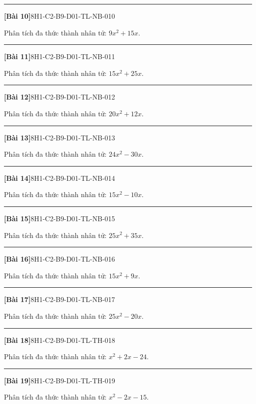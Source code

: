 \documentclass[12pt,a4paper]{article}
\newif\ifloigiai
\newenvironment{cauhoi}[2]{%
  \par\medskip\noindent\rule{\textwidth}{0.4pt}\par\nopagebreak
  \noindent\textbf{[#1]}\hfill{\scriptsize\ttfamily #2}\par\nopagebreak\smallskip}{\par}
\newcommand{\loigiai}[1]{\ifloigiai\par\smallskip\noindent\textit{Lời giải.} #1\par\fi}
\begin{document}
\begin{cauhoi}{Bài 10}{8H1-C2-B9-D01-TL-NB-010}
Phân tích đa thức thành nhân tử: $9x^{2} + 15x$.
\loigiai{Nhân tử chung của các hạng tử là $3x$. Vậy $9x^{2} + 15x=3x(3x + 5)$.}
\end{cauhoi}
\begin{cauhoi}{Bài 11}{8H1-C2-B9-D01-TL-NB-011}
Phân tích đa thức thành nhân tử: $15x^{2} + 25x$.
\loigiai{Nhân tử chung của các hạng tử là $5x$. Vậy $15x^{2} + 25x=5x(3x + 5)$.}
\end{cauhoi}
\begin{cauhoi}{Bài 12}{8H1-C2-B9-D01-TL-NB-012}
Phân tích đa thức thành nhân tử: $20x^{2} + 12x$.
\loigiai{Nhân tử chung của các hạng tử là $4x$. Vậy $20x^{2} + 12x=4x(5x + 3)$.}
\end{cauhoi}
\begin{cauhoi}{Bài 13}{8H1-C2-B9-D01-TL-NB-013}
Phân tích đa thức thành nhân tử: $24x^{2} - 30x$.
\loigiai{Nhân tử chung của các hạng tử là $6x$. Vậy $24x^{2} - 30x=6x(4x - 5)$.}
\end{cauhoi}
\begin{cauhoi}{Bài 14}{8H1-C2-B9-D01-TL-NB-014}
Phân tích đa thức thành nhân tử: $15x^{2} - 10x$.
\loigiai{Nhân tử chung của các hạng tử là $5x$. Vậy $15x^{2} - 10x=5x(3x - 2)$.}
\end{cauhoi}
\begin{cauhoi}{Bài 15}{8H1-C2-B9-D01-TL-NB-015}
Phân tích đa thức thành nhân tử: $25x^{2} + 35x$.
\loigiai{Nhân tử chung của các hạng tử là $5x$. Vậy $25x^{2} + 35x=5x(5x + 7)$.}
\end{cauhoi}
\begin{cauhoi}{Bài 16}{8H1-C2-B9-D01-TL-NB-016}
Phân tích đa thức thành nhân tử: $15x^{2} + 9x$.
\loigiai{Nhân tử chung của các hạng tử là $3x$. Vậy $15x^{2} + 9x=3x(5x + 3)$.}
\end{cauhoi}
\begin{cauhoi}{Bài 17}{8H1-C2-B9-D01-TL-NB-017}
Phân tích đa thức thành nhân tử: $25x^{2} - 20x$.
\loigiai{Nhân tử chung của các hạng tử là $5x$. Vậy $25x^{2} - 20x=5x(5x - 4)$.}
\end{cauhoi}
\begin{cauhoi}{Bài 18}{8H1-C2-B9-D01-TL-TH-018}
Phân tích đa thức thành nhân tử: $x^{2} + 2x - 24$.
\loigiai{Nhóm hạng tử: $x^{2} + 2x - 24=(x^{2} + 6x)+(-4x - 24)=x(x + 6)-4(x + 6)=(x + 6)(x - 4)$.}
\end{cauhoi}
\begin{cauhoi}{Bài 19}{8H1-C2-B9-D01-TL-TH-019}
Phân tích đa thức thành nhân tử: $x^{2} - 2x - 15$.
\loigiai{Nhóm hạng tử: $x^{2} - 2x - 15=(x^{2} + 3x)+(-5x - 15)=x(x + 3)-5(x + 3)=(x + 3)(x - 5)$.}
\end{cauhoi}
\end{document}

